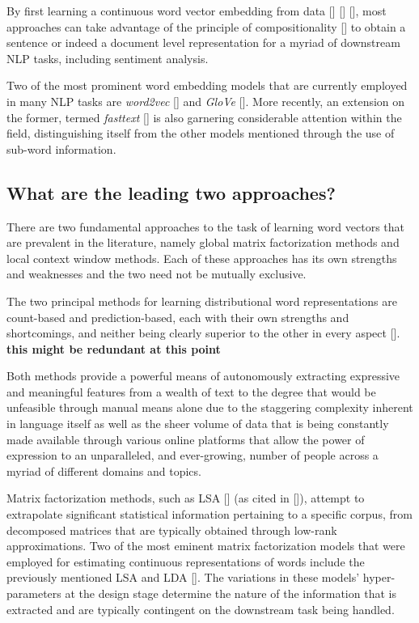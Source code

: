 \documentclass[12pt, a4paper]{report}
\theoremstyle{definition}
\theoremstyle{definition}%
\theoremstyle{definition}%
\theoremstyle{definition}%
\theoremstyle{definition}%
\theoremstyle{definition}%
\renewcommand{\cite}[1]{[\citealp{#1}]}
\begin{document}
By first learning a continuous word vector embedding from data \cite{bengio2003} \cite{mikolov2013} \cite{pennington}, most approaches can take advantage of the principle of compositionality \cite{frege1892} to obtain a sentence or indeed a document level representation for a myriad of downstream NLP tasks, including sentiment analysis. 

Two of the most prominent word embedding models that are currently employed in many NLP tasks are \textit{word2vec} \cite{mikolov2013} and \textit{GloVe} \cite{pennington}. More recently, an extension on the former, termed \textit{fasttext} \cite{bojanowski2017} is also garnering considerable attention within the field, distinguishing itself from the other models mentioned through the use of sub-word information.  
\subsection{What are the leading two approaches?}
There are two fundamental approaches to the task of learning word vectors that are prevalent in the literature, namely global matrix factorization methods and local context window methods. Each of these approaches has its own strengths and weaknesses and the two need not be mutually exclusive. 

The two principal methods for learning distributional word representations are count-based and prediction-based, each with their own strengths and shortcomings, and neither being clearly superior to the other in every aspect \cite{pennington}. 
\textbf{this might be redundant at this point}


Both methods provide a powerful means of autonomously extracting expressive and meaningful features from a wealth of text to the degree that would be unfeasible through manual means alone due to the staggering complexity inherent in language itself as well as the sheer volume of data that is being constantly made available through various online platforms that allow the power of expression to an unparalleled, and ever-growing, number of people across a myriad of different domains and topics.   


Matrix factorization methods, such as LSA \cite{deerwester1990} (as cited in \cite{mikolov2013}), attempt to extrapolate significant statistical information pertaining to a specific corpus, from decomposed matrices that are typically obtained through low-rank approximations. Two of the most eminent matrix factorization models that were employed for estimating continuous representations of words include the previously mentioned LSA and LDA \cite{mikolov2013}. The variations in these models' hyper-parameters at the design stage determine the nature of the information that is extracted and are typically contingent on the downstream task being handled.
\end{document}
